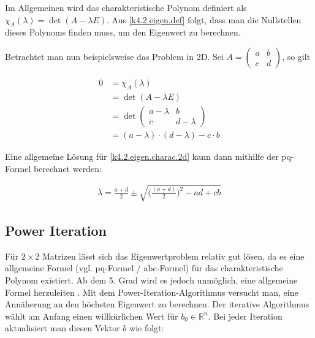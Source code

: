 \documentclass[]{dsadokumentation}
\begin{document}
Im Allgemeinen wird das charakteristische Polynom definiert als $\chi_A (\lambda) = \det(A - \lambda E)$. Aus \cref{k4.2.eigen.def} folgt, dass man die Nullstellen dieses Polynoms finden muss, um den Eigenwert zu berechnen. 

Betrachtet man nun beispielsweise das Problem in 2D. Sei $A = \begin{pmatrix}
  a & b \\
  c & d
\end{pmatrix}$, so gilt

\begin{equation}
  \label{k4.2.eigen.charac.2d}
  \begin{aligned}
    0  
    &= \chi_A (\lambda) \\
    &= \det(A - \lambda E) \\
    &= \det \begin{pmatrix}
      a - \lambda & b \\
      c & d-\lambda
    \end{pmatrix} \\
    &= (a - \lambda) \cdot (d - \lambda) - c \cdot b
  \end{aligned}
\end{equation}

Eine allgemeine Lösung für \cref{k4.2.eigen.charac.2d} kann dann mithilfe der pq-Formel berechnet werden:

\begin{equation}
  \begin{aligned}
    \lambda = \frac{a+d}{2} \pm \sqrt{\Big(\frac{(a+d)}{2}\Big)^2-ad+cb} 
  \end{aligned}
\end{equation}


\subsection{Power Iteration}\label{k4.2.eigen.powerit}

Für $2 \times 2$ Matrizen lässt sich das Eigenwertproblem relativ gut lösen, da es eine allgemeine Formel (vgl. pq-Formel / abc-Formel) für das charakteristische Polynom existiert. Ab dem 5. Grad wird es jedoch unmöglich, eine allgemeine Formel herzuleiten \parencite{k4.2.ramond}. %
Mit dem Power-Iteration-Algorithmus versucht man, eine Annäherung an den höchsten Eigenwert zu berechnen. Der iterative Algorithmus wählt am Anfang einen willkürlichen Wert für $b_0 \in \mathbb{R}^n$. Bei jeder Iteration aktualisiert man diesen Vektor $b$ wie folgt: 
\end{document}
